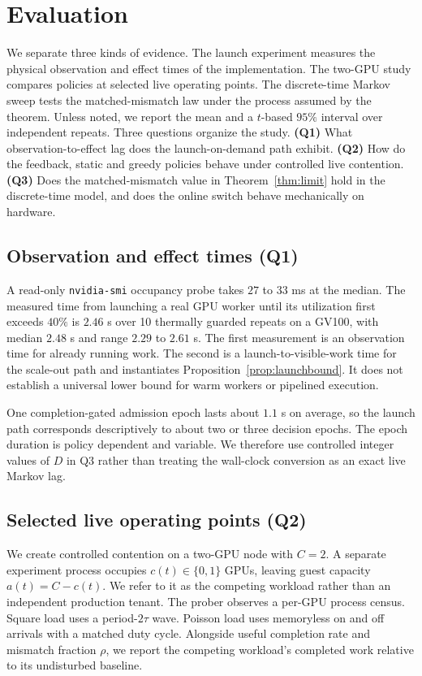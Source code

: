 \section{Evaluation}
\label{sec:eval}

We separate three kinds of evidence. The launch experiment measures the physical
observation and effect times of the implementation. The two-GPU study compares
policies at selected live operating points. The discrete-time Markov sweep tests
the matched-mismatch law under the process assumed by the theorem. Unless noted,
we report the mean and a $t$-based $95\%$ interval over independent repeats.
Three questions organize the study. \textbf{(Q1)} What observation-to-effect lag
does the launch-on-demand path exhibit. \textbf{(Q2)} How do the feedback, static
and greedy policies behave under controlled live contention. \textbf{(Q3)} Does
the matched-mismatch value in Theorem~\ref{thm:limit} hold in the discrete-time
model, and does the online switch behave mechanically on hardware.

\subsection{Observation and effect times (Q1)}
\label{sec:eval-detection}
A read-only \texttt{nvidia-smi} occupancy probe takes $27$ to $33$ ms at the
median. The measured time from launching a real GPU worker until its utilization
first exceeds $40\%$ is $2.46$ s over 10 thermally guarded repeats on a GV100,
with median $2.48$ s and range $2.29$ to $2.61$ s. The first measurement is an
observation time for already running work. The second is a launch-to-visible-work
time for the scale-out path and instantiates Proposition~\ref{prop:launchbound}.
It does not establish a universal lower bound for warm workers or pipelined
execution.

One completion-gated admission epoch lasts about $1.1$ s on average, so the
launch path corresponds descriptively to about two or three decision epochs. The
epoch duration is policy dependent and variable. We therefore use controlled
integer values of $D$ in Q3 rather than treating the wall-clock conversion as an
exact live Markov lag.

\subsection{Selected live operating points (Q2)}
\label{sec:eval-contended}
We create controlled contention on a two-GPU node with $C=2$. A separate
experiment process occupies $c(t)\in\{0,1\}$ GPUs, leaving guest capacity
$a(t)=C-c(t)$. We refer to it as the competing workload rather than an
independent production tenant. The prober observes a per-GPU process census.
Square load uses a period-$2\tau$ wave. Poisson load uses memoryless on and off
arrivals with a matched duty cycle. Alongside useful completion rate and mismatch
fraction $\rho$, we report the competing workload's completed work relative to
its undisturbed baseline.

